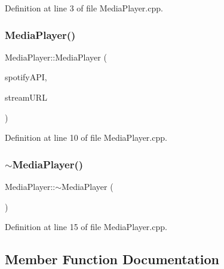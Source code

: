 Definition at line 3 of file Media\+Player.\+cpp.

\mbox{\label{class_media_player_a93f1f35c22c8195c6786d26f944eef51}} 
\subsubsection{\texorpdfstring{Media\+Player()}{MediaPlayer()}\hspace{0.1cm}{\footnotesize\ttfamily [2/2]}}
{\footnotesize\ttfamily Media\+Player\+::\+Media\+Player (\begin{DoxyParamCaption}\item[{\mbox{\hyperlink{class_spotify_a_p_i}{Spotify\+A\+PI}}}]{spotify\+A\+PI,  }\item[{std\+::string}]{stream\+U\+RL }\end{DoxyParamCaption})}



Definition at line 10 of file Media\+Player.\+cpp.

\mbox{\label{class_media_player_accc0b8e6669a8ec0842aa906a9da1511}} 
\subsubsection{\texorpdfstring{$\sim$\+Media\+Player()}{~MediaPlayer()}}
{\footnotesize\ttfamily Media\+Player\+::$\sim$\+Media\+Player (\begin{DoxyParamCaption}{ }\end{DoxyParamCaption})}



Definition at line 15 of file Media\+Player.\+cpp.



\subsection{Member Function Documentation}
\mbox{\label{class_media_player_a12c176a856cba35eff631cca707bd97b}} 

